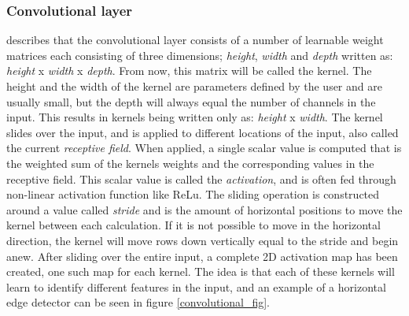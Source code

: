     \subsubsection{Convolutional layer}
     \citeauthor{o2015introduction_convolutions}\cite{o2015introduction_convolutions} describes that the convolutional layer consists of a number of learnable  weight matrices each consisting of three dimensions; \textit{height}, \textit{width} and \textit{depth} written as: \textit{height} x \textit{width} x \textit{depth}. From now, this matrix will be called the kernel. The height and the width of the kernel are parameters defined by the user and are usually small, but the depth will always equal the number of channels in the input. This results in kernels being written only as: \textit{height} x \textit{width}. The kernel slides over the input, and is applied to different locations of the input, also called the current \textit{receptive field}. When applied, a single scalar value is computed that is the weighted sum of the kernels weights and the corresponding values in the receptive field. This scalar value is called the \textit{activation}, and is often fed through non-linear activation function like ReLu. The sliding operation is constructed around a value called \textit{stride} and is the amount of horizontal positions to move the kernel between each calculation. If it is not possible to move in the horizontal direction, the kernel will move rows down vertically equal to the stride and begin anew. After sliding over the entire input, a complete 2D activation map has been created, one such map for each kernel. The idea is that each of these kernels will learn to identify different features in the input, and an example of a horizontal edge detector can be seen in figure \ref{convolutional_fig}.
    \clearpage
